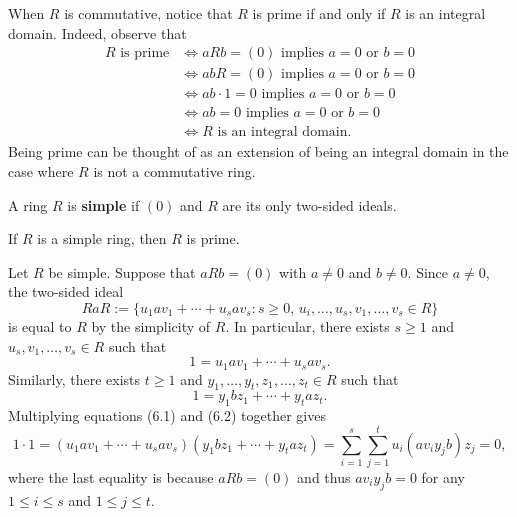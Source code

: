 When $R$ is commutative, notice that $R$ is prime if and only if $R$ is an integral domain. 
Indeed, observe that 
\begin{align*}
    R \text{ is prime} &\iff aRb = (0) \text{ implies } a = 0 \text{ or } b = 0 \\
    &\iff abR = (0) \text{ implies } a = 0 \text{ or } b = 0 \\
    &\iff ab \cdot 1 = 0 \text{ implies } a = 0 \text{ or } b = 0 \\
    &\iff ab = 0 \text{ implies } a = 0 \text{ or } b = 0 \\
    &\iff R \text{ is an integral domain.}
\end{align*}
Being prime can be thought of as an extension of being an integral domain in the case where $R$ 
is not a commutative ring. 

\begin{defn}{}
A ring $R$ is {\bf simple} if $(0)$ and $R$ are its only two-sided ideals.
\end{defn}

\begin{prop}{}
If $R$ is a simple ring, then $R$ is prime. 
\end{prop}
\begin{pf}
Let $R$ be simple. Suppose that $aRb = (0)$ with $a \neq 0$ and $b \neq 0$. Since $a \neq 0$, the 
two-sided ideal 
\[ RaR := \{u_1av_1 + \cdots + u_sav_s : s \geq 0,\, u_i, \dots, u_s, v_1, \dots, v_s \in R\} \]
is equal to $R$ by the simplicity of $R$. In particular, there exists $s \geq 1$ and 
$u_s, v_1, \dots, v_s \in R$ such that 
\begin{equation}
    1 = u_1av_1 + \cdots + u_sav_s. 
\end{equation}
Similarly, there exists $t \geq 1$ and $y_1, \dots, y_t, z_1, \dots, z_t \in R$ such that 
\begin{equation}
    1 = y_1bz_1 + \cdots + y_taz_t. 
\end{equation}
Multiplying equations (6.1) and (6.2) together gives 
\[ 1 \cdot 1 = (u_1av_1 + \cdots + u_sav_s)(y_1bz_1 + \cdots + y_taz_t) 
= \sum_{i=1}^s \sum_{j=1}^t u_i(av_iy_jb)z_j = 0, \]
where the last equality is because $aRb = (0)$ and thus $av_iy_jb = 0$ for any $1 \leq i \leq s$ 
and $1 \leq j \leq t$. 
\end{pf}

